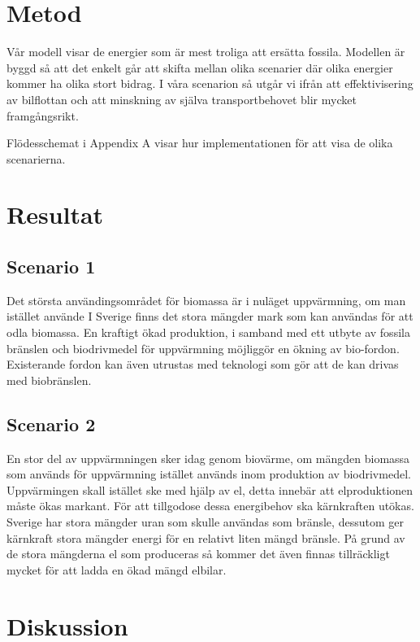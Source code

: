 \documentclass[a4paper,11pt,fleqn, titlepage]{article}
\begin{document}
\section{Metod}

Vår modell visar de energier som är mest troliga att ersätta fossila.
Modellen är byggd så att det enkelt går att skifta mellan olika scenarier
där olika energier kommer ha olika stort bidrag. I våra scenarion så utgår
vi ifrån att effektivisering av bilflottan och att minskning av själva
transportbehovet blir mycket framgångsrikt.


Flödesschemat i Appendix A visar hur implementationen för att visa de olika
scenarierna.

\section{Resultat}

\subsection{Scenario 1}

Det största användingsområdet för biomassa är i nuläget uppvärmning, om man istället använde
I Sverige finns det stora mängder mark som kan användas för att odla biomassa. En kraftigt ökad produktion, i samband med ett utbyte av fossila bränslen och biodrivmedel för uppvärmning möjliggör en ökning av bio-fordon. Existerande fordon kan även utrustas med teknologi som gör att de kan drivas med biobränslen.

\subsection{Scenario 2}

En stor del av uppvärmningen sker idag genom biovärme, om mängden biomassa som används för uppvärmning istället används inom produktion av biodrivmedel. Uppvärmingen skall istället ske med hjälp av el, detta innebär att elproduktionen måste ökas markant. För att tillgodose dessa energibehov ska kärnkraften utökas. Sverige har stora mängder uran som skulle användas som bränsle, dessutom ger kärnkraft stora mängder energi för en relativt liten mängd bränsle. På grund av de stora mängderna el som produceras så kommer det även finnas tillräckligt mycket för att ladda en ökad mängd elbilar.


\section{Diskussion}
\end{document}
